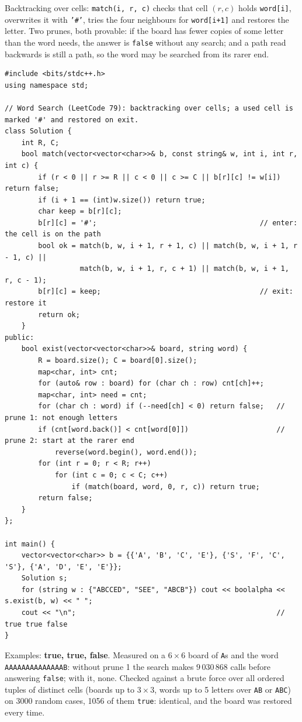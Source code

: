 \begin{solutionbox}
Backtracking over cells: \texttt{match(i, r, c)} checks that cell $(r,c)$ holds \texttt{word[i]}, overwrites it with \texttt{'\#'}, tries the four neighbours for \texttt{word[i+1]} and restores the letter. Two prunes, both provable: if the board has fewer copies of some letter than the word needs, the answer is \texttt{false} without any search; and a path read backwards is still a path, so the word may be searched from its rarer end.
\begin{lstlisting}[style=cpp]
#include <bits/stdc++.h>
using namespace std;

// Word Search (LeetCode 79): backtracking over cells; a used cell is marked '#' and restored on exit.
class Solution {
    int R, C;
    bool match(vector<vector<char>>& b, const string& w, int i, int r, int c) {
        if (r < 0 || r >= R || c < 0 || c >= C || b[r][c] != w[i]) return false;
        if (i + 1 == (int)w.size()) return true;
        char keep = b[r][c];
        b[r][c] = '#';                                       // enter: the cell is on the path
        bool ok = match(b, w, i + 1, r + 1, c) || match(b, w, i + 1, r - 1, c) ||
                  match(b, w, i + 1, r, c + 1) || match(b, w, i + 1, r, c - 1);
        b[r][c] = keep;                                      // exit: restore it
        return ok;
    }
public:
    bool exist(vector<vector<char>>& board, string word) {
        R = board.size(); C = board[0].size();
        map<char, int> cnt;
        for (auto& row : board) for (char ch : row) cnt[ch]++;
        map<char, int> need = cnt;
        for (char ch : word) if (--need[ch] < 0) return false;   // prune 1: not enough letters
        if (cnt[word.back()] < cnt[word[0]])                     // prune 2: start at the rarer end
            reverse(word.begin(), word.end());
        for (int r = 0; r < R; r++)
            for (int c = 0; c < C; c++)
                if (match(board, word, 0, r, c)) return true;
        return false;
    }
};

int main() {
    vector<vector<char>> b = {{'A', 'B', 'C', 'E'}, {'S', 'F', 'C', 'S'}, {'A', 'D', 'E', 'E'}};
    Solution s;
    for (string w : {"ABCCED", "SEE", "ABCB"}) cout << boolalpha << s.exist(b, w) << " ";
    cout << "\n";                                                // true true false
}
\end{lstlisting}
Examples: \textbf{true, true, false}. Measured on a $6 \times 6$ board of \texttt{A}s and the word \texttt{AAAAAAAAAAAAAAB}: without prune 1 the search makes $9\,030\,868$ calls before answering \texttt{false}; with it, none. Checked against a brute force over all ordered tuples of distinct cells (boards up to $3 \times 3$, words up to 5 letters over \texttt{AB} or \texttt{ABC}) on 3000 random cases, 1056 of them \texttt{true}: identical, and the board was restored every time.
\end{solutionbox}

